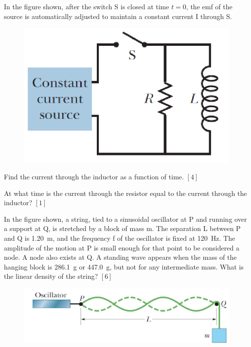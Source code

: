 \begin{problem}
    In the figure shown, after the switch S is closed at time $t = 0$, the emf of the source is automatically adjusted to maintain a constant current I through S.
    \begin{figure}[H]
        \centering
        \includegraphics{spho_book_TYS_images/2021SPhO_4.png}
    \end{figure}
    \begin{subproblemalph}
        \item Find the current through the inductor as
a function of time. \hfill $[4]$
        \item At what time is the current through the
resistor equal to the current through the
inductor? \hfill $[1]$
    \end{subproblemalph} 
\end{problem}

\begin{problem}
    In the figure shown, a string, tied to a sinusoidal oscillator at P and running over a support at Q, is stretched by a block of mass m. The separation L between P and Q is \qty{1.20}{m}, and the frequency f of the oscillator is fixed at \qty{120}{Hz}. The amplitude of the motion at P is small enough for that point to be considered a node. A node also exists at Q. A standing wave appears when the mass of the hanging block is \qty{286.1}{g} or \qty{447.0}{g}, but not for any intermediate mass. What is the linear density of the string? \hfill $[6]$
    \begin{figure}[H]
        \centering
        \includegraphics[width=0.8\linewidth]{spho_book_TYS_images/2021SPhO_5.png}
    \end{figure}
\end{problem}

